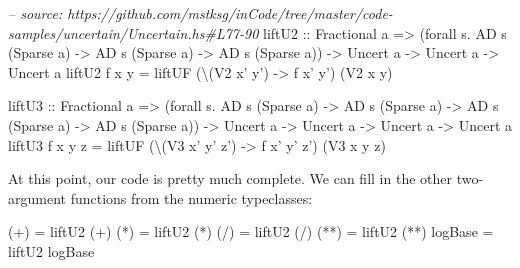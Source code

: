 \documentclass[]{article}
\newenvironment{Shaded}{}{}
\newcommand{\DataTypeTok}[1]{\textcolor[rgb]{0.56,0.13,0.00}{#1}}
\newcommand{\CommentTok}[1]{\textcolor[rgb]{0.38,0.63,0.69}{\textit{#1}}}
\newcommand{\OtherTok}[1]{\textcolor[rgb]{0.00,0.44,0.13}{#1}}
\newcommand{\FunctionTok}[1]{\textcolor[rgb]{0.02,0.16,0.49}{#1}}
\newcommand{\NormalTok}[1]{#1}
\begin{document}
\begin{Shaded}
\begin{Highlighting}[]
\CommentTok{-- source: https://github.com/mstksg/inCode/tree/master/code-samples/uncertain/Uncertain.hs#L77-90}
\OtherTok{liftU2 ::} \DataTypeTok{Fractional}\NormalTok{ a}
       \OtherTok{=>}\NormalTok{ (forall s}\FunctionTok{.} \DataTypeTok{AD}\NormalTok{ s (}\DataTypeTok{Sparse}\NormalTok{ a) }\OtherTok{->} \DataTypeTok{AD}\NormalTok{ s (}\DataTypeTok{Sparse}\NormalTok{ a) }\OtherTok{->} \DataTypeTok{AD}\NormalTok{ s (}\DataTypeTok{Sparse}\NormalTok{ a))}
       \OtherTok{->} \DataTypeTok{Uncert}\NormalTok{ a}
       \OtherTok{->} \DataTypeTok{Uncert}\NormalTok{ a}
       \OtherTok{->} \DataTypeTok{Uncert}\NormalTok{ a}
\NormalTok{liftU2 f x y }\FunctionTok{=}\NormalTok{ liftUF (\textbackslash{}(}\DataTypeTok{V2}\NormalTok{ x' y') }\OtherTok{->}\NormalTok{ f x' y') (}\DataTypeTok{V2}\NormalTok{ x y)}

\OtherTok{liftU3 ::} \DataTypeTok{Fractional}\NormalTok{ a}
       \OtherTok{=>}\NormalTok{ (forall s}\FunctionTok{.} \DataTypeTok{AD}\NormalTok{ s (}\DataTypeTok{Sparse}\NormalTok{ a) }\OtherTok{->} \DataTypeTok{AD}\NormalTok{ s (}\DataTypeTok{Sparse}\NormalTok{ a) }\OtherTok{->} \DataTypeTok{AD}\NormalTok{ s (}\DataTypeTok{Sparse}\NormalTok{ a) }\OtherTok{->} \DataTypeTok{AD}\NormalTok{ s (}\DataTypeTok{Sparse}\NormalTok{ a))}
       \OtherTok{->} \DataTypeTok{Uncert}\NormalTok{ a}
       \OtherTok{->} \DataTypeTok{Uncert}\NormalTok{ a}
       \OtherTok{->} \DataTypeTok{Uncert}\NormalTok{ a}
       \OtherTok{->} \DataTypeTok{Uncert}\NormalTok{ a}
\NormalTok{liftU3 f x y z }\FunctionTok{=}\NormalTok{ liftUF (\textbackslash{}(}\DataTypeTok{V3}\NormalTok{ x' y' z') }\OtherTok{->}\NormalTok{ f x' y' z') (}\DataTypeTok{V3}\NormalTok{ x y z)}
\end{Highlighting}
\end{Shaded}

At this point, our code is pretty much complete. We can fill in the other
two-argument functions from the numeric typeclasses:

\begin{Shaded}
\begin{Highlighting}[]
\NormalTok{(}\FunctionTok{+}\NormalTok{)     }\FunctionTok{=}\NormalTok{ liftU2 (}\FunctionTok{+}\NormalTok{)}
\NormalTok{(}\FunctionTok{*}\NormalTok{)     }\FunctionTok{=}\NormalTok{ liftU2 (}\FunctionTok{*}\NormalTok{)}
\NormalTok{(}\FunctionTok{/}\NormalTok{)     }\FunctionTok{=}\NormalTok{ liftU2 (}\FunctionTok{/}\NormalTok{)}
\NormalTok{(}\FunctionTok{**}\NormalTok{)    }\FunctionTok{=}\NormalTok{ liftU2 (}\FunctionTok{**}\NormalTok{)}
\NormalTok{logBase }\FunctionTok{=}\NormalTok{ liftU2 logBase}
\end{Highlighting}
\end{Shaded}
\end{document}
